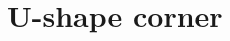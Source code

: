 \section{U-shape corner}
%
\begin{figure}[ht!]
    \centering
    \caption{}
    \label{fig:U-Shape}
\end{figure}
%